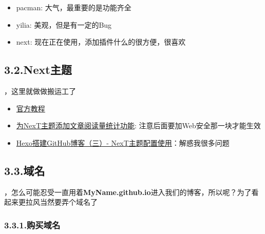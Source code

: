 \documentclass{article}
\begin{document}
\begin{itemize}%

\item{}
pacman: 大气，最重要的是功能齐全%

\item{}
yilia: 美观，但是有一定的Bug%

\item{}
next: 现在正在使用，添加插件什么的很方便，很喜欢%
\end{itemize}%

\subsection{3.2.\hspace*{0.5em}Next主题}\label{sec-next}%

，这里就做做搬运工了%

\begin{itemize}%

\item{}
\href{http://theme-next.iissnan.com/getting-started.html}{官方教程}%

\item{}
\href{https://notes.wanghao.work/2015-10-21-\%25E4\%25B8\%25BANexT\%25E4\%25B8\%25BB\%25E9\%25A2\%2598\%25E6\%25B7\%25BB\%25E5\%258A\%25A0\%25E6\%2596\%2587\%25E7\%25AB\%25A0\%25E9\%2598\%2585\%25E8\%25AF\%25BB\%25E9\%2587\%258F\%25E7\%25BB\%259F\%25E8\%25AE\%25A1\%25E5\%258A\%259F\%25E8\%2583\%25BD.html\%23\%25E9\%2585\%258D\%25E7\%25BD\%25AELeanCloud}{为NexT主题添加文章阅读量统计功能}: 注意后面要加Web安全那一块才能生效%

\item{}
\href{http://zhiho.github.io/2015/09/29/hexo-next/}{Hexo搭建GitHub博客（三）- NexT主题配置使用}：解惑我很多问题%
\end{itemize}%

\subsection{3.3.\hspace*{0.5em}域名}\label{section}%

，怎么可能忍受一直用着\textbf{MyName.github.io}进入我们的博客，所以呢？为了看起来更拉风当然要弄个域名了%

\subsubsection{3.3.1.\hspace*{0.5em}购买域名}\label{section}%
\end{document}
